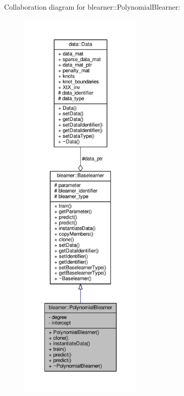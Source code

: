 Collaboration diagram for blearner\+:\+:Polynomial\+Blearner\+:\nopagebreak
\begin{figure}[H]
\begin{center}
\leavevmode
\includegraphics[height=550pt]{classblearner_1_1_polynomial_blearner__coll__graph}
\end{center}
\end{figure}
